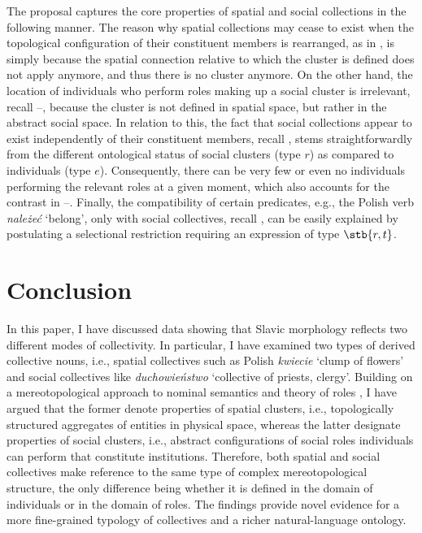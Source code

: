 \documentclass[output=paper]{langscibook}
\begin{document}
The proposal captures the core properties of spatial and social collections in the following manner. The reason why spatial collections may cease to exist when the topological configuration of their constituent members is rearranged, as in , is simply because the spatial connection relative to which the cluster is defined does not apply anymore, and thus there is no cluster anymore. On the other hand, the location of individuals who perform roles making up a social cluster is irrelevant, recall --, because the cluster is not defined in spatial space, but rather in the abstract social space. In relation to this, the fact that social collections appear to exist independently of their constituent members, recall , stems straightforwardly from the different ontological status of social clusters (type $r$) as compared to individuals (type $e$). Consequently, there can be very few or even no individuals performing the relevant roles at a given moment, which also accounts for the contrast in --. Finally, the compatibility of certain predicates, e.g., the Polish verb \textit{należeć} `belong', only with social collectives, recall , can be easily explained by postulating a selectional restriction requiring an expression of type $\stb{r,t}$.

\section{Conclusion}\label{wan:sec:conclusion}

In this paper, I have discussed data showing that Slavic morphology reflects two different modes of collectivity. In particular, I have examined two types of derived collective nouns, i.e., spatial collectives such as Polish \textit{kwiecie} `clump of flowers' and social collectives like \textit{duchowieństwo} `collective of priests, clergy'. Building on a mereotopological approach to nominal semantics \citep{grimm2012number} and theory of roles \citep{zobel2017sensitivity}, I have argued that the former denote properties of spatial clusters, i.e., topologically structured aggregates of entities in physical space, whereas the latter designate properties of social clusters, i.e., abstract configurations of social roles individuals can perform that constitute institutions. Therefore, both spatial and social collectives make reference to the same type of complex mereotopological structure, the only difference being whether it is defined in the domain of individuals or in the domain of roles. The findings provide novel evidence for a more fine-grained typology of collectives and a richer natural-language ontology.
\end{document}
